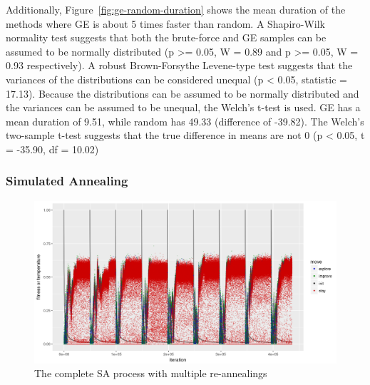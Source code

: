 Additionally, Figure~\ref{fig:ge-random-duration} shows the mean duration of the methods where \gls{GE} is about 5 times faster than random.
A Shapiro-Wilk normality test suggests that both the brute-force and \gls{GE} samples can be assumed to be normally distributed (p >= 0.05, W = 0.89 and p >= 0.05, W = 0.93 respectively).
A robust Brown-Forsythe Levene-type test suggests that the variances of the distributions can be considered unequal (p < 0.05, statistic = 17.13).
Because the distributions can be assumed to be normally distributed and the variances can be assumed to be unequal, the Welch's t-test is used.
\gls{GE} has a mean duration of 9.51, while random has 49.33 (difference of -39.82).
The Welch's two-sample t-test suggests that the true difference in means are not 0 (p < 0.05, t = -35.90, df = 10.02)

\subsubsection{Simulated Annealing}
\begin{figure}
    \includegraphics[width=\textwidth]{figures/sa-progress}
    \caption[The complete SA process with multiple re-annealings]{The complete \gls{SA} process with multiple re-annealings}
    \label{fig:sa-progress}
\end{figure}

